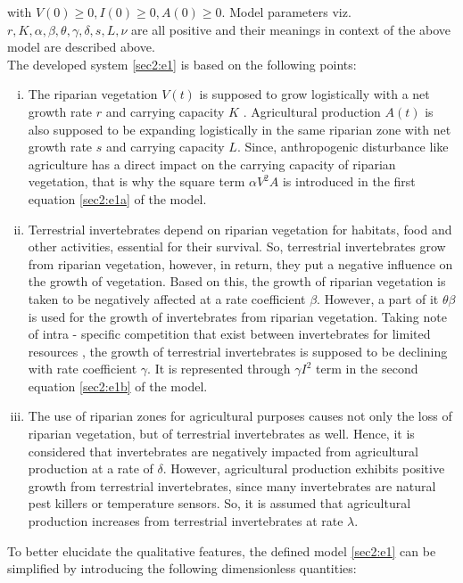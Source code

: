 \documentclass[12pt,a4wide]{report}
\numberwithin{equation}{chapter}
\numberwithin{theorem}{chapter}
\begin{document}
with $V(0) \geq 0, I(0)\geq 0, A(0)\geq 0$. Model parameters viz. $r, K, \alpha, \beta, \theta, \gamma, \delta, s, L, \nu$ are all positive and their meanings in context of the above model are described above.  \\
The developed system \eqref{sec2:e1} is based on the following points:
\begin{enumerate}[i).]
\item The riparian vegetation $V(t)$ is supposed to grow logistically  with a net growth rate $r$ and carrying capacity $K$ \cite{perucca2007}. Agricultural production $A(t)$ is also supposed to be expanding logistically in the same riparian zone with net growth rate $s$ and carrying capacity $L$. Since, anthropogenic disturbance like agriculture has a direct impact on the carrying capacity of riparian vegetation, that is why the square term $\alpha V^2 A$ is introduced in the first equation \eqref{sec2:e1a} of the model.
\item  Terrestrial invertebrates depend on riparian vegetation for habitats, food and other activities, essential for their survival. So, terrestrial invertebrates grow from riparian vegetation, however, in return, they put a negative influence on the growth of vegetation. Based on this, the growth of riparian vegetation is taken to be negatively affected at a rate coefficient $\beta$. However, a part of it $\theta \beta$ is used for the growth of invertebrates from riparian vegetation. Taking note of intra - specific competition that exist between invertebrates for limited resources \cite{ruetz2003interspecific}, the growth of terrestrial invertebrates is supposed to be declining with rate coefficient $\gamma$. It is represented through $\gamma I^2$ term in the second equation \eqref{sec2:e1b} of the model. 
\item The use of riparian zones for agricultural purposes causes  not only the loss of riparian vegetation, but of terrestrial invertebrates as well. Hence, it is considered that invertebrates are negatively impacted from agricultural production at a rate of $\delta$. However, agricultural production exhibits positive growth from terrestrial invertebrates, since many invertebrates are natural pest killers or temperature sensors. So, it is assumed that agricultural production increases from terrestrial invertebrates at rate $\lambda$. 
\end{enumerate}
To better elucidate the qualitative features, the defined model \eqref{sec2:e1} can be simplified by introducing the following dimensionless quantities:\\
\end{document}
